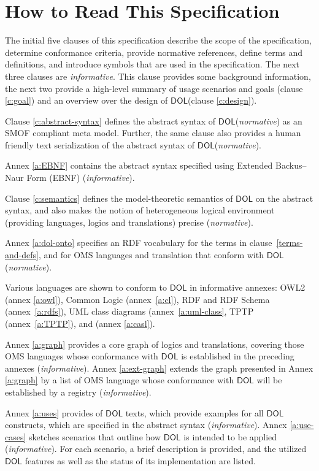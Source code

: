 \documentclass[10pt,fleqn,final]{scrreprt}
\newcommand*{\DOL}{\ensuremath{\mathsf{DOL}}\xspace}
\newenvironment{definitions}[0]{\medskip }{}
\begin{document}
\begin{definitions}
\section{How to Read This Specification}

The initial five clauses of this specification describe the scope of the specification, determine conformance criteria, provide normative references, define terms and definitions, and introduce symbols that are used in the specification. 
The next three clauses are \emph{informative}. This clause provides some background information, the next two provide a high-level
 summary of usage scenarios and goals (clause \ref{c:goal}) and an overview over the design of
\DOL  (clause \ref{c:design}).


\medskip \noindent 

Clause \ref{c:abstract-syntax} defines the abstract syntax of \DOL (\emph{normative}) as an SMOF compliant meta model.
Further,  the same clause also provides a human friendly text serialization of the abstract syntax of 
\DOL (\emph{normative}). 

Annex \ref{a:EBNF} contains the abstract syntax specified using Extended
Backus–Naur Form (EBNF) 
(\emph{informative}).

\medskip \noindent Clause \ref{c:semantics} defines the
model-theoretic semantics of \DOL on the abstract syntax, and also
makes the notion of heterogeneous logical environment (providing
languages, logics and translations) precise (\emph{normative}).

\medskip \noindent Annex \ref{a:dol-onto} specifies an RDF vocabulary for
the terms in clause~\ref{terms-and-defs}, and for OMS languages and
translation that conform with \DOL  (\emph{normative}).

\medskip \noindent Various languages are shown to  conform to \DOL in
informative annexes: OWL2 (annex \ref{a:owl}), Common Logic
(annex~\ref{a:cl}), RDF and RDF Schema (annex~\ref{a:rdfs}), UML class
diagrams (annex~\ref{a:uml-class}, TPTP (annex~\ref{a:TPTP}), and
\CASL (annex \ref{a:casl}).

\medskip \noindent 
Annex \ref{a:graph}  provides a core graph of logics and translations, covering those OMS languages
whose conformance with \DOL is established in the preceding annexes (\emph{informative}). 
Annex \ref{a:ext-graph} extends the graph presented in Annex \ref{a:graph}  by a list of OMS
language whose conformance with \DOL will be established by a registry
(\emph{informative}).

\medskip \noindent 
Annex \ref{a:uses} provides of \DOL texts, which provide examples for all \DOL constructs, which 
are specified in the abstract syntax 
(\emph{informative}).
Annex \ref{a:use-cases} sketches scenarios that outline how \DOL is intended to be applied  (\emph{informative}). For 
each scenario,  a brief description  is provided, and the utilized \DOL features as well as the status of its implementation are listed.


\end{definitions}
\end{document}
